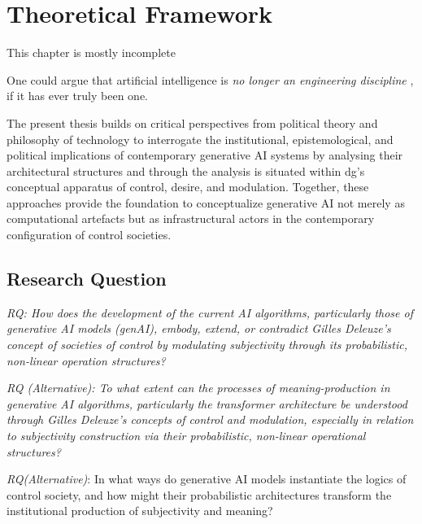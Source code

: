 
\chapter{Theoretical Framework}\label{theoretical}

\begin{orangebox}
	This chapter is mostly incomplete
\end{orangebox}



One could argue that artificial intelligence is \emph{no longer an engineering discipline} \parencite[206]{dignum2023}, if it has ever truly been one.


The present thesis builds on critical perspectives from political theory and philosophy of technology to interrogate the institutional, epistemological, and political implications of contemporary generative AI systems by analysing their architectural structures and through the analysis is situated within \gls{dg}'s conceptual apparatus of control, desire, and modulation. Together, these approaches provide the foundation to conceptualize generative AI not merely as computational artefacts but as infrastructural actors in the contemporary configuration of control societies.

\section{Research Question}

\begin{center}

	\textit{RQ: How does the development of the current AI algorithms, particularly those of generative AI models (genAI), embody, extend, or contradict Gilles Deleuze’s concept of societies of control by modulating subjectivity through its probabilistic, non-linear operation structures?}

	\textit{RQ (Alternative): To what extent can the processes of meaning-production in generative AI algorithms, particularly the transformer architecture be understood through Gilles Deleuze’s concepts of control and modulation, especially in relation to subjectivity construction via their probabilistic, non-linear operational structures?}

	\textit{RQ(Alternative)}: In what ways do generative AI models instantiate the logics of control society, and how might their probabilistic architectures transform the institutional production of subjectivity and meaning?

\end{center}

